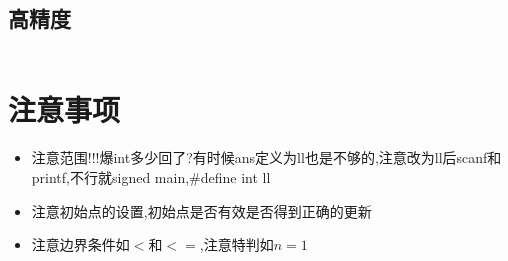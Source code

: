 \documentclass[a4paper,11pt]{article}
\begin{document}
\subsection{高精度}
\inputminted[breaklines,linenos,frame=leftline]{c++}{others/bignum1.cpp}


\newpage
\section{注意事项}
\begin{itemize}
    \item 注意范围!!!爆int多少回了?有时候ans定义为ll也是不够的,注意改为ll后scanf和printf,不行就signed main,\#define int ll
    \item 注意初始点的设置,初始点是否有效是否得到正确的更新
    \item 注意边界条件如$<$和$<=$,注意特判如$n=1$
\end{itemize}
\end{document}
